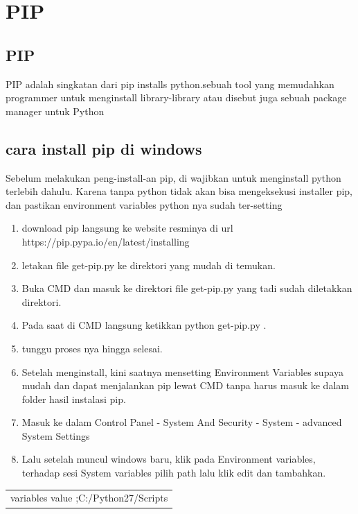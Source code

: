 
\section{PIP}

    \subsection{PIP}
	PIP adalah singkatan dari pip installs python.sebuah tool yang memudahkan programmer untuk menginstall library-library  atau disebut juga sebuah package manager untuk Python

	\subsection{cara install pip di windows}
	Sebelum melakukan peng-install-an pip, di wajibkan untuk menginstall python terlebih dahulu. Karena tanpa python tidak akan bisa mengeksekusi installer pip, dan pastikan environment variables python nya sudah ter-setting
		\begin{enumerate}
			\item download pip langsung ke website resminya di url https://pip.pypa.io/en/latest/installing
			\item letakan file get-pip.py ke direktori yang mudah di temukan.
			\item Buka CMD dan masuk ke direktori file get-pip.py yang tadi sudah diletakkan direktori.
			\item Pada saat di CMD langsung ketikkan python get-pip.py .
			\item tunggu proses nya hingga selesai.
			\item Setelah menginstall, kini saatnya mensetting Environment Variables supaya mudah dan dapat menjalankan pip lewat CMD tanpa harus masuk ke dalam folder hasil instalasi pip.
			\item Masuk ke dalam Control Panel - System And Security - System - advanced System Settings
			\item Lalu setelah muncul windows baru, klik pada Environment variables, terhadap sesi System variables pilih path lalu klik edit dan tambahkan.
		\end{enumerate}
				\begin{table}[H]
					\begin{tabular}{|c|}
						\hline
						variables value ;C:/Python27/Scripts\\
					\end{tabular}
				\end{table}
		
